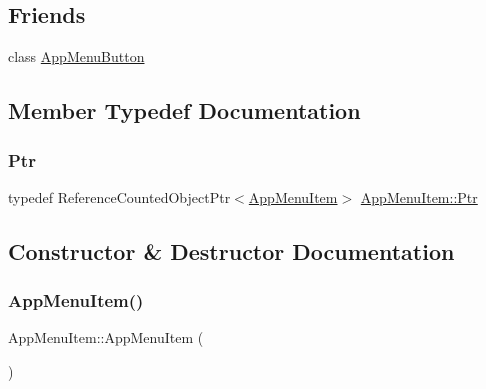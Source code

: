 \subsection*{Friends}
\begin{DoxyCompactItemize}
\item 
class \mbox{\hyperlink{classAppMenuItem_a80d64300ccdfd78a62e2e759ee92ec3b}{App\+Menu\+Button}}
\end{DoxyCompactItemize}


\subsection{Member Typedef Documentation}
\mbox{\label{classAppMenuItem_ab5f51c5d74f8df62b8862c0cc8126cb7}} 
\subsubsection{\texorpdfstring{Ptr}{Ptr}}
{\footnotesize\ttfamily typedef Reference\+Counted\+Object\+Ptr$<$\mbox{\hyperlink{classAppMenuItem}{App\+Menu\+Item}}$>$ \mbox{\hyperlink{classAppMenuItem_ab5f51c5d74f8df62b8862c0cc8126cb7}{App\+Menu\+Item\+::\+Ptr}}}



\subsection{Constructor \& Destructor Documentation}
\mbox{\label{classAppMenuItem_a5762f4a6394da50af01ec644cb71bd21}} 
\subsubsection{\texorpdfstring{App\+Menu\+Item()}{AppMenuItem()}}
{\footnotesize\ttfamily App\+Menu\+Item\+::\+App\+Menu\+Item (\begin{DoxyParamCaption}{ }\end{DoxyParamCaption})}

\mbox{\label{classAppMenuItem_a1f1e4cbbec28a4564053efce890e95cd}} 
